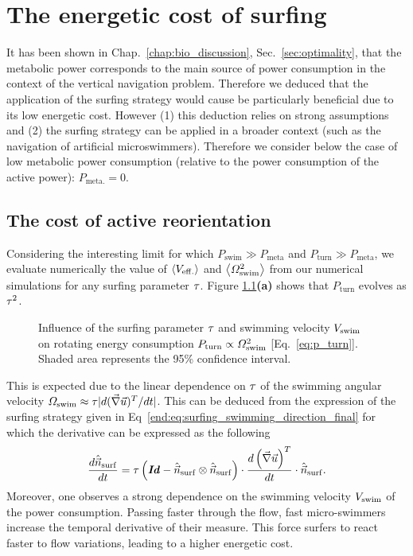 \chapter{The energetic cost of surfing}\label{app:energetic_cost}

It has been shown in Chap.~\ref{chap:bio_discussion}, Sec.~\ref{sec:optimality}, that the metabolic power corresponds to the main source of power consumption in the context of the vertical navigation problem.
Therefore we deduced that the application of the surfing strategy would cause be particularly beneficial due to its low energetic cost.
However (1) this deduction relies on strong assumptions and (2) the surfing strategy can be applied in a broader context (such as the navigation of artificial microswimmers).
Therefore we consider below the case of low metabolic power consumption (relative to the power consumption of the active power): $P_{\mathrm{meta.}} = 0$.

\section{The cost of active reorientation}\label{sec:energetic_cost}

Considering the interesting limit for which $P_{\mathrm{swim}} \gg P_{\mathrm{meta}}$ and $P_{\mathrm{turn}} \gg P_{\mathrm{meta}}$, we evaluate numerically the value of $\left\langle V_{\mathrm{eff.}} \right\rangle$ and $\left\langle \varOmega_{\mathrm{swim}}^2 \right\rangle$ from our numerical simulations for any surfing parameter $\TimeHorizon$.
Figure \ref{fig:energy_efficiency_time_horizon}\textbf{(a)} shows that $P_{\mathrm{turn}}$ evolves as $\tau^2$.
\begin{figure}%
	\centering
	
	\caption[Influence of the surfing parameter $\TimeHorizon$ and swimming velocity on rotating power consumption.]{
		Influence of the surfing parameter $\TimeHorizon$ and swimming velocity $V_{\mathrm{swim}}$ on rotating energy consumption $P_{\mathrm{turn}} \propto \varOmega_{\mathrm{swim}}^2$ [Eq.~\eqref{eq:p_turn}].
		Shaded area represents the 95\% confidence interval.
	}
	\label{fig:energy_efficiency_time_horizon}
\end{figure}
This is expected due to the linear dependence on $\TimeHorizon$ of the swimming angular velocity $\varOmega_{\mathrm{swim}} \approx \tau \lvert d(\vec{\nabla} \vec{u})^T/dt\rvert$.
This can be deduced from the expression of the surfing strategy given in Eq~\eqref{end:eq:surfing_swimming_direction_final} for which the derivative can be expressed as the following
\begin{equation}
	\frac{d \hat{\vec{n}}_{\mathrm{surf}}}{dt} = \tau \left( \boldsymbol{\mathit{Id}} - \hat{\vec{n}}_{\mathrm{surf}} \otimes \hat{\vec{n}}_{\mathrm{surf}} \right) \cdot \frac{d \left( \vec{\nabla} \vec{u} \right)^T}{dt} \cdot \hat{\vec{n}}_{\mathrm{surf}}.
\end{equation}
Moreover, one observes a strong dependence on the swimming velocity $V_{\mathrm{swim}}$ of the power consumption.
Passing faster through the flow, fast micro-swimmers increase the temporal derivative of their measure.
This force surfers to react faster to flow variations, leading to a higher energetic cost.

